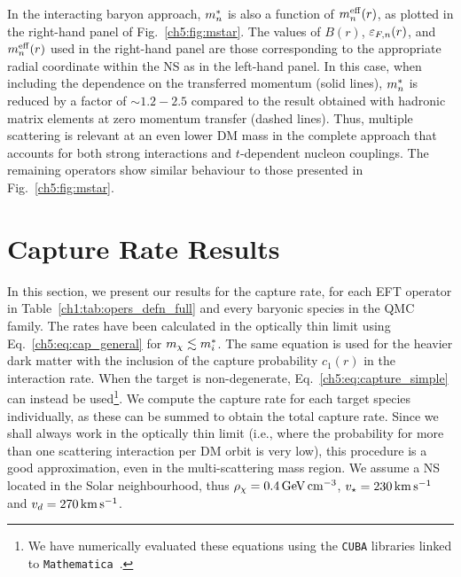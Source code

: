 In the interacting baryon approach, $m_n^*$ is also a function of $m_n^{\rm eff}(r)$, as plotted in the right-hand panel of Fig.~\ref{ch5:fig:mstar}. 
The values of $B(r)$, $\varepsilon_{F,n}(r)$, and $m_n^{\rm eff}(r)$ used in the right-hand panel are those corresponding to the appropriate radial coordinate within the NS as in the left-hand panel. 
In this case, when including the dependence on the transferred momentum (solid lines), $m_n^*$ is reduced by a factor of $\sim 1.2 - 2.5$ compared to the result obtained with hadronic matrix elements at zero momentum transfer (dashed lines). Thus, multiple scattering is relevant at an even lower DM mass in the complete approach that accounts for both strong interactions and $t$-dependent nucleon couplings. 
The remaining operators show similar behaviour to those presented in Fig.~\ref{ch5:fig:mstar}.


\section{Capture Rate Results}
\label{ch5:sec:capture_results}

In this section, we present our results for the capture rate, 
for each EFT operator in Table~\ref{ch1:tab:opers_defn_full} and every baryonic species in the QMC family. The rates have been calculated in the optically thin limit using Eq.~\ref{ch5:eq:cap_general} for $m_\chi\lesssim m_i^*$. The same equation is used for the heavier dark matter with the inclusion of the capture probability $c_1(r)$ in the interaction rate. When the target is non-degenerate,  Eq.~\ref{ch5:eq:capture_simple} can instead be used\footnote{We have numerically evaluated these equations using the \texttt{CUBA} libraries \cite{Hahn:2004fe_CUBALibrarymultidimensional,Hahn:2014fua_Concurrentcuba} linked to \texttt{Mathematica}~\cite{Mathematica}.}. We compute the capture rate for each target species individually, as these can be summed to obtain the total capture rate. Since we shall always work in the optically thin limit (i.e., where the probability for more than one scattering interaction per DM orbit is very low), this procedure is a good approximation, even in the multi-scattering mass region.
We assume a NS located in the Solar neighbourhood, thus $\rho_\chi=0.4{\rm \,GeV}{\rm \,cm}^{-3}$, $v_\star=230{\rm \,km}{\rm \,s}^{-1}$ and $v_d=270{\rm \,km}{\rm \,s}^{-1}$.  



